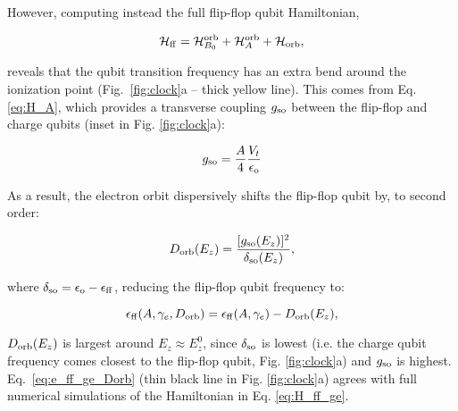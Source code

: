 \documentclass[aps,prb,superscriptaddress,nobibnotes,twocolumn]{revtex4-1}
\begin{document}
However, computing instead the full flip-flop qubit Hamiltonian,

\begin{equation} \label{eq:H_ff_ge}
\mathcal{H}_{\rm ff} = \mathcal{H}_{B_0}^{\rm orb} +\mathcal{H}_{A}^{\rm orb} + \mathcal{H}_{\rm orb},
\end{equation}

reveals that the qubit transition frequency has an extra bend around the ionization point (Fig.~\ref{fig:clock}a -- thick yellow line). This comes from Eq. \ref{eq:H_A}, which provides a transverse coupling $g_{\rm so}$ between the flip-flop and charge qubits (inset in Fig. \ref{fig:clock}a):

\begin{equation} \label{eq:g_so}
g_{\rm so}=\frac{A}{4}\frac{V_t}{\epsilon_{\rm o}}
\end{equation}

As a result, the electron orbit dispersively shifts the flip-flop qubit by, to second order:

\begin{equation} \label{eq:Dorb}
D_{\rm orb}(E_z)=\frac{[g_{\rm so}(E_z)]^2}{\delta_{\rm so}(E_z)},
\end{equation}

where $\delta_{\rm so}=\epsilon_{\rm o} - \epsilon_{\rm ff}$, reducing the flip-flop qubit frequency to:

\begin{equation} \label{eq:e_ff_ge_Dorb}
\epsilon_{\rm ff}(A,\gamma_e,D_{\rm orb})=\epsilon_{\rm ff}(A,\gamma_e)-D_{\rm orb}(E_z),
\end{equation}

$D_{\rm orb}(E_z)$ is largest around $E_z\approx E_z^0$, since $\delta_{\rm so}$ is lowest (i.e. the charge qubit frequency comes closest to the flip-flop qubit, Fig. \ref{fig:clock}a) and $g_{\rm so}$ is highest. Eq.~\ref{eq:e_ff_ge_Dorb} (thin black line in Fig. \ref{fig:clock}a) agrees with full numerical simulations of the Hamiltonian in Eq. \ref{eq:H_ff_ge}. 
\end{document}
